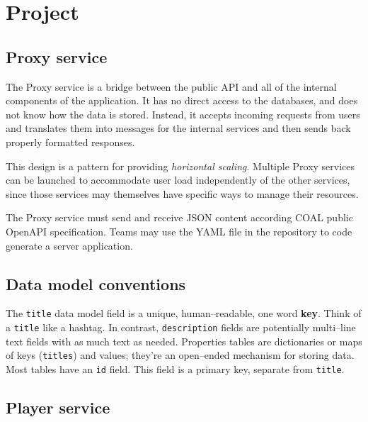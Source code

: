 \documentclass{article}
\newcommand{\enterProblemHeader}[1]{
}
\newcommand{\exitProblemHeader}[1]{
\nobreak\extramarks{#1}{}\nobreak
}
\newcounter{homeworkProblemCounter} %
\newcommand{\homeworkProblemName}{}
\newenvironment{homeworkProblem}[1][Problem \arabic{homeworkProblemCounter}]{ %
\stepcounter{homeworkProblemCounter} %
\renewcommand{\homeworkProblemName}{#1} %
\section{\homeworkProblemName} %
\enterProblemHeader{\homeworkProblemName} %
}{
\exitProblemHeader{\homeworkProblemName} %
}
\newcommand{\homeworkSectionName}{}
\newenvironment{homeworkSection}[1]{ %
\renewcommand{\homeworkSectionName}{#1} %
\subsection{\homeworkSectionName} %
\enterProblemHeader{\homeworkProblemName\ [\homeworkSectionName]} %
}{
\enterProblemHeader{\homeworkProblemName} %
}
\begin{document}
\begin{homeworkProblem}[Project]
\begin{homeworkSection}{Proxy service}
	The Proxy service is a bridge between the public API and all of the internal components of the application. It has no direct access to the databases, and does not know how the data is stored. Instead, it accepts incoming requests from users and translates them into messages for the internal services and then sends back properly formatted responses.
	
	This design is a pattern for providing \textit{horizontal scaling}. Multiple Proxy services can be launched to accommodate user load independently of the other services, since those services may themselves have specific ways to manage their resources.

	The Proxy service must send and receive JSON content according COAL public OpenAPI specification. Teams may use the YAML file in the repository to code generate a server application.
\end{homeworkSection}

\begin{homeworkSection}{Data model conventions}
	The \texttt{title} data model field is a unique, human--readable, one word \textbf{key}. Think of a \texttt{title} like a hashtag. In contrast, \texttt{description} fields are potentially multi--line text fields with as much text as needed. Properties tables are dictionaries or maps of keys (\texttt{titles}) and values; they're an open--ended mechanism for storing data. Most tables have an \texttt{id} field. This field is a primary key, separate from \texttt{title}.
\end{homeworkSection}

\begin{homeworkSection}{Player service}

\begin{figure}
	\centering		
\end{figure}
\end{homeworkSection}
\end{homeworkProblem}
\end{document}
